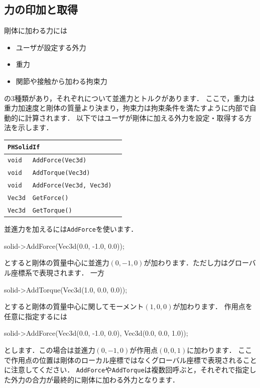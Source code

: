\subsection*{\KLUDGE 力の印加と取得}

\KLUDGE 剛体に加わる力には
\begin{itemize}
\item \KLUDGE ユーザが設定する外力
\item \KLUDGE 重力
\item \KLUDGE 関節や接触から加わる拘束力
\end{itemize}
\KLUDGE の$3$\KLUDGE 種類があり，それぞれについて並進力とトルクがあります．
\KLUDGE ここで，重力は重力加速度と剛体の質量より決まり，拘束力は拘束条件を満たすように内部で自動的に計算されます．
\KLUDGE 以下ではユーザが剛体に加える外力を設定・取得する方法を示します．

\begin{center}
\begin{tabular}{p{.2\hsize}p{.5\hsize}p{.20\hsize}}
\multicolumn{3}{l}{\texttt{PHSolidIf}}								\\ \midrule
\texttt{void} 	& \texttt{AddForce(Vec3d)}					& \\
\texttt{void} 	& \texttt{AddTorque(Vec3d)}					& \\
\texttt{void} 	& \texttt{AddForce(Vec3d, Vec3d)}			& \\
\texttt{Vec3d} 	& \texttt{GetForce()}						& \\
\texttt{Vec3d} 	& \texttt{GetTorque()}						& \\
\end{tabular}
\end{center}

\KLUDGE 並進力を加えるには\texttt{AddForce}\KLUDGE を使います．
\begin{sourcecode}
solid->AddForce(Vec3d(0.0, -1.0, 0.0));
\end{sourcecode}
\KLUDGE とすると剛体の質量中心に並進力$(0, -1, 0)$\KLUDGE が加わります．ただし力はグローバル座標系で表現されます．
\KLUDGE 一方
\begin{sourcecode}
solid->AddTorque(Vec3d(1.0, 0.0, 0.0));
\end{sourcecode}
\KLUDGE とすると剛体の質量中心に関してモーメント$(1, 0, 0)$\KLUDGE が加わります．
\KLUDGE 作用点を任意に指定するには
\begin{sourcecode}
solid->AddForce(Vec3d(0.0, -1.0, 0.0), Vec3d(0.0, 0.0, 1.0));
\end{sourcecode}
\KLUDGE とします．この場合は並進力$(0, -1, 0)$\KLUDGE が作用点$(0, 0, 1)$\KLUDGE に加わります．
\KLUDGE ここで作用点の位置は剛体のローカル座標ではなくグローバル座標で表現されることに注意してください．
\texttt{AddForce}\KLUDGE や\texttt{AddTorque}\KLUDGE は複数回呼ぶと，それぞれで指定した外力の合力が最終的に剛体に加わる外力となります．

